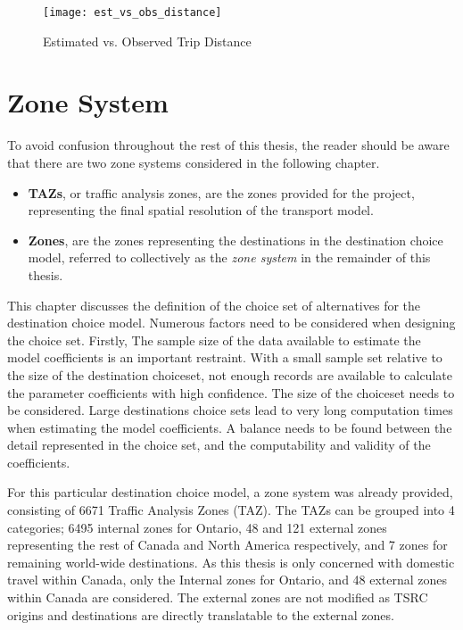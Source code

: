 \begin{figure}[H]
\centering
\texttt{[image: est\_vs\_obs\_distance]}
\caption{Estimated vs. Observed Trip Distance}
\label{fig:distance}
\end{figure}

\section{Zone System}
To avoid confusion throughout the rest of this thesis, the reader should be aware that there are two zone systems considered in the following chapter.
\begin{itemize}
\item \textbf{TAZs}, or traffic analysis zones, are the zones provided for the project, representing the final spatial resolution of the transport model.
\item \textbf{Zones}, are the zones representing the destinations in the destination choice model, referred to collectively as the \textit{zone system} in the remainder of this thesis.  
\end{itemize}

This chapter discusses the definition of the choice set of alternatives for the destination choice model. Numerous factors need to be considered when designing the choice set. Firstly, The sample size of the data available to estimate the model coefficients is an important restraint. With a small sample set relative to the size of the destination choiceset, not enough records are available to calculate the parameter coefficients with high confidence. The size of the choiceset needs to be considered. Large destinations choice sets lead to very long computation times when estimating the model coefficients. A balance needs to be found between the detail represented in the choice set, and the computability and validity of the coefficients.

For this particular destination choice model, a zone system was already provided, consisting of 6671 Traffic Analysis Zones (TAZ). The TAZs can be grouped into 4 categories; 6495 internal zones for Ontario, 48 and 121 external zones representing the rest of Canada and North America respectively, and 7 zones for remaining world-wide destinations. As this thesis is only concerned with domestic travel within Canada, only the Internal zones for Ontario, and 48 external zones within Canada are considered. The external zones are not modified as TSRC origins and destinations are directly translatable to the external zones.

